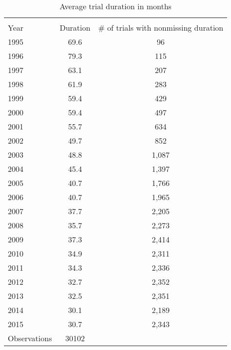 \begin{table}[htbp]\centering
\caption{Average trial duration in months}
\begin{tabular}{l*{1}{cc}}
\hline\hline
                    &\multicolumn{2}{c}{}     \\
Year                &    Duration&\# of trials with nonmissing duration\\
\hline
1995                &        69.6&          96\\
1996                &        79.3&         115\\
1997                &        63.1&         207\\
1998                &        61.9&         283\\
1999                &        59.4&         429\\
2000                &        59.4&         497\\
2001                &        55.7&         634\\
2002                &        49.7&         852\\
2003                &        48.8&       1,087\\
2004                &        45.4&       1,397\\
2005                &        40.7&       1,766\\
2006                &        40.7&       1,965\\
2007                &        37.7&       2,205\\
2008                &        35.7&       2,273\\
2009                &        37.3&       2,414\\
2010                &        34.9&       2,311\\
2011                &        34.3&       2,336\\
2012                &        32.7&       2,352\\
2013                &        32.5&       2,351\\
2014                &        30.1&       2,189\\
2015                &        30.7&       2,343\\
\hline
Observations        &       30102&            \\
\hline\hline
\end{tabular}
\end{table}
